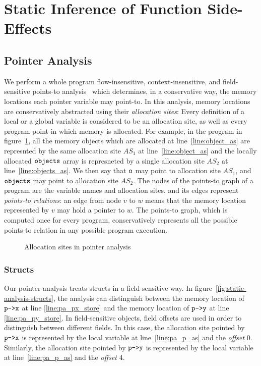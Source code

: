 
\section{Static Inference of Function Side-Effects}
\label{section:static-analysis}

\subsection{Pointer Analysis}
We perform a whole program flow-insensitive, context-insensitive, and field-sensitive
points-to analysis~\cite{Hind:Paste2001, Smaragdakis:FTPL2015} which
determines, in a conservative way, the memory locations each pointer
variable may point-to. In this analysis, memory locations are
conservatively abstracted using their \emph{allocation sites}:
Every definition of a local or a global variable is considered to be an
allocation site, as well as every program point in which memory is allocated.
For example, in the program in figure~\ref{fig:static-analysis},
all the memory objects which are allocated at line~\ref{line:object_as}
are represnted by the same allocation site $\mathit{AS_1}$ at line~\ref{line:object_as}
and the locally allocated $\texttt{objects}$ array is represneted
by a single allocation site $\mathit{AS_2}$ at line~\ref{line:objects_as}.
We then say that $\texttt{o}$ may point to allocation
site $\mathit{AS_1}$, and $\texttt{objects}$ may point to allocation site $\mathit{AS_2}$.
The nodes of the points-to graph of a
program are the variable names and allocation sites, and its edges
represent \emph{points-to relations}:
an edge from node $v$ to $w$ means that the memory location
represented by $v$ may hold a pointer to $w$.
The points-to graph, which is computed once for every program,
conservatively represents all the possible points-to relation in any
possible program execution. 

\begin{figure}
  \captionsetup[subfloat]{labelformat=empty}
  \subfloat[]{
    
  }
  \caption{Allocation sites in pointer analysis}
  \label{fig:static-analysis}
\end{figure}

\subsubsection{Structs}
Our pointer analysis treats structs in a field-sensitive way.
In figure~\ref{fig:static-analysis-structs},
the analysis can distinguish between the memory location of $\texttt{p->x}$ at line \ref{line:pa_px_store}
and the memory location of $\texttt{p->y}$ at line \ref{line:pa_py_store}.
In field-sensitive objects, field offsets are used in order to distinguish between different fields.
In this case, the allocation site pointed by $\texttt{p->x}$ is represented by
the local variable at line~\ref{line:pa_p_as} and the \textit{offset} 0.
Similarly, the allocation site pointed by $\texttt{p->y}$ is represented by
the local variable at line~\ref{line:pa_p_as} and the \textit{offset} 4.

